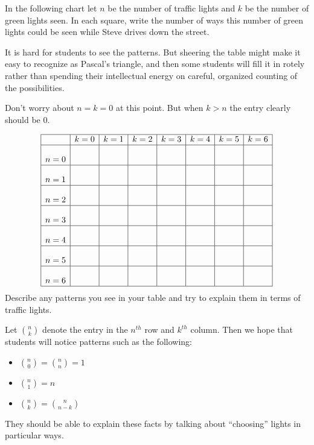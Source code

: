 \documentclass{ximera}
\begin{document}
\begin{problem} 
In the following chart let $n$ be the number of traffic
lights and $k$ be  the number of green lights seen. In each square, write the number of ways this number of green lights could be seen while Steve drives down the street.
\newpage

\begin{teachingnote}
It is hard for students to see the patterns.  But sheering the table might make it easy to recognize as Pascal's triangle, and then some students will fill it in rotely rather than spending their intellectual energy on careful, organized counting of the possibilities.  

Don't worry about $n = k = 0$ at this point.  But when $k > n$ the entry clearly should be $0$. 
\end{teachingnote}
\[
\begin{array}{|c|c|c|c|c|c|c|c|}
    \hline
          & k=0 & k=1 & k=2 & k=3 & k=4 & k=5 & k = 6\\
    \hline
    n=0 &\rule[0mm]{0mm}{7mm}&       &       &       &       &   &   \\
    \hline
    n=1 &\rule[0mm]{0mm}{7mm}  &       &       &       &       &   &   \\
    \hline
    n=2 & \rule[0mm]{0mm}{7mm} &     &     &       &       &    &  \\
    \hline
    n=3 &\rule[0mm]{0mm}{7mm}       &       &       &       &       &   &   \\
    \hline
    n=4 & \rule[0mm]{0mm}{7mm}      &       &       &       &       &   &   \\
    \hline
    n=5 &\rule[0mm]{0mm}{7mm}       &       &       &       &       &   &   \\
    \hline
    n=6 &\rule[0mm]{0mm}{7mm}       &       &       &       &       &   &   \\
    \hline
\end{array}
\]
Describe any patterns you see in your table and try to explain them in
terms of traffic lights.
\begin{teachingnote}
Let $\binom{n}{k}$ denote the entry in the $n^{th}$ row and $k^{th}$ column.  Then we hope that students will notice patterns such as the following: 
\begin{itemize}
\item $\binom{n}{0} = \binom{n}{n} = 1$
\item $\binom{n}{1} = n$
\item $\binom{n}{k} = \binom{n}{n-k}$
\end{itemize}
They should be able to explain these facts by talking about ``choosing'' lights in particular ways.  
\end{teachingnote}
\end{problem}
\end{document}
